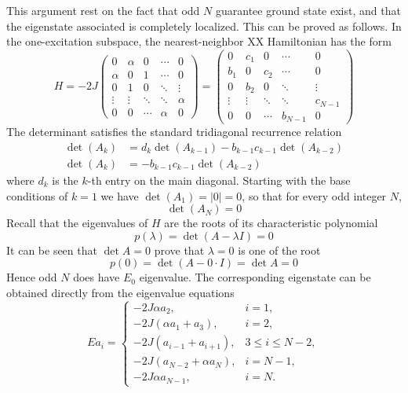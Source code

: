 \documentclass[../../../main.tex]{subfiles}
\begin{document}
This argument rest on the fact that odd $N$ guarantee ground state exist, and that the eigenstate associated is completely localized.
This can be proved as follows.
In the one-excitation subspace, the nearest-neighbor XX Hamiltonian has the form
\begin{equation*}
  H =
  -2J
  \begin{pmatrix}
    0      & \alpha & 0      & \cdots & 0      \\
    \alpha & 0      & 1      & \cdots & 0      \\
    0      & 1      & 0      & \ddots & \vdots \\
    \vdots & \vdots & \ddots & \ddots & \alpha \\
    0      & 0      & \cdots & \alpha & 0
  \end{pmatrix}
  = \begin{pmatrix} 0 & c_1 & 0 & \cdots & 0 \\ b_1 & 0 & c_2 & \cdots & 0 \\ 0 & b_2 & 0 & \ddots & \vdots \\ \vdots & \vdots & \ddots & \ddots & c_{N-1} \\ 0 & 0 & \cdots & b_{N-1} & 0 \end{pmatrix}
\end{equation*}
The determinant satisfies the standard tridiagonal recurrence relation
\begin{align*}
  \det(A_k) & =  d_k \det(A_{k-1}) - b_{k-1}c_{k-1} \det(A_{k-2}) \\
  \det(A_k) & = -b_{k-1}c_{k-1} \det(A_{k-2})
\end{align*}
where $d_k$ is the $k$-th entry on the main diagonal.
Starting with the base conditions of $k = 1$ we have $\det(A_1) = |0| = 0$, so that for every odd integer $N$,
\begin{equation*}
  \det(A_N) = 0
\end{equation*}
Recall that the eigenvalues of $H$ are the roots of its characteristic polynomial
\begin{equation*}
  p(\lambda) = \det(A - \lambda I) = 0
\end{equation*}
It can be seen that $\det A = 0$ prove that $\lambda=0$ is one of the root
\begin{equation*}
  p(0) = \det(A - 0\cdot I) = \det A = 0
\end{equation*}
Hence odd $N$ does have $E_0$ eigenvalue.
The corresponding eigenstate can be obtained directly from the eigenvalue equations
\begin{equation*}
  E a_i=
  \begin{cases}
    -2J\alpha a_2,              & i=1,           \\
    -2J(\alpha a_{1}+a_{3}),    & i = 2,         \\
    -2J(a_{i-1}+a_{i+1}),       & 3\le i\le N-2, \\
    -2J( a_{N-2}+\alpha a_{N}), & i = N-1,       \\
    -2J\alpha a_{N-1},          & i=N.
  \end{cases}
\end{equation*}
\end{document}
